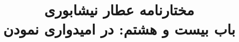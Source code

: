 \documentclass[14pt,b5paper]{article}
\begin{document}
\title{\Huge مختارنامه عطار نیشابوری \\
باب بیست و هشتم: در امیدواری نمودن}
\author{ }
\date{ }
\maketitle
\newpage
\tableofcontents
\newpage

\newpage

\newpage

\newpage

\newpage

\newpage

\newpage

\newpage

\newpage

\newpage

\newpage

\newpage

\newpage

\newpage

\newpage

\newpage

\newpage

\newpage

\newpage
\end{document}
